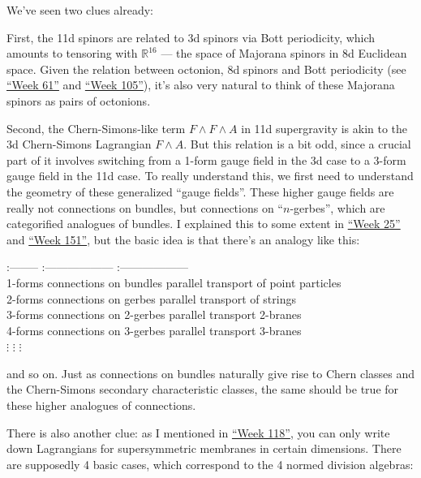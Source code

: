 \documentclass{article}
\begin{document}
We've seen two clues already:

First, the 11d spinors are related to 3d spinors via Bott periodicity,
which amounts to tensoring with \(\mathbb{R}^{16}\) --- the space of
Majorana spinors in 8d Euclidean space. Given the relation between
octonion, 8d spinors and Bott periodicity (see
\protect\hyperlink{week61}{``Week 61''} and
\protect\hyperlink{week105}{``Week 105''}), it's also very natural to
think of these Majorana spinors as pairs of octonions.

Second, the Chern-Simons-like term \(F\wedge F\wedge A\) in 11d
supergravity is akin to the 3d Chern-Simons Lagrangian \(F\wedge A\).
But this relation is a bit odd, since a crucial part of it involves
switching from a 1-form gauge field in the 3d case to a 3-form gauge
field in the 11d case. To really understand this, we first need to
understand the geometry of these generalized ``gauge fields''. These
higher gauge fields are really not connections on bundles, but
connections on ``\(n\)-gerbes'', which are categorified analogues of
bundles. I explained this to some extent in
\protect\hyperlink{week25}{``Week 25''} and
\protect\hyperlink{week151}{``Week 151''}, but the basic idea is that
there's an analogy like this:

:-------- \textbar{} :------------------ \textbar{} :------------------
\textbar{}\\
1-forms \textbar{} connections on bundles \textbar{} parallel transport
of point particles \textbar{}\\
2-forms \textbar{} connections on gerbes \textbar{} parallel transport
of strings \textbar{}\\
3-forms \textbar{} connections on 2-gerbes \textbar{} parallel transport
2-branes \textbar{}\\
4-forms \textbar{} connections on 3-gerbes \textbar{} parallel transport
3-branes \textbar{}\\
\(\vdots\) \textbar{} \(\vdots\) \textbar{} \(\vdots\) \textbar{}

and so on. Just as connections on bundles naturally give rise to Chern
classes and the Chern-Simons secondary characteristic classes, the same
should be true for these higher analogues of connections.

There is also another clue: as I mentioned in
\protect\hyperlink{week118}{``Week 118''}, you can only write down
Lagrangians for supersymmetric membranes in certain dimensions. There
are supposedly 4 basic cases, which correspond to the 4 normed division
algebras:
\end{document}
